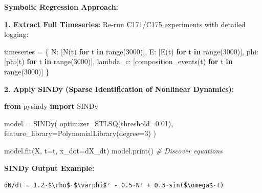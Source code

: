 \documentclass[
]{article}
\newenvironment{Shaded}{}{}
\newcommand{\BuiltInTok}[1]{\textcolor[rgb]{0.00,0.50,0.00}{#1}}
\newcommand{\CommentTok}[1]{\textcolor[rgb]{0.38,0.63,0.69}{\textit{#1}}}
\newcommand{\ControlFlowTok}[1]{\textcolor[rgb]{0.00,0.44,0.13}{\textbf{#1}}}
\newcommand{\DecValTok}[1]{\textcolor[rgb]{0.25,0.63,0.44}{#1}}
\newcommand{\FloatTok}[1]{\textcolor[rgb]{0.25,0.63,0.44}{#1}}
\newcommand{\ImportTok}[1]{\textcolor[rgb]{0.00,0.50,0.00}{\textbf{#1}}}
\newcommand{\KeywordTok}[1]{\textcolor[rgb]{0.00,0.44,0.13}{\textbf{#1}}}
\newcommand{\NormalTok}[1]{#1}
\newcommand{\OperatorTok}[1]{\textcolor[rgb]{0.40,0.40,0.40}{#1}}
\newcommand{\StringTok}[1]{\textcolor[rgb]{0.25,0.44,0.63}{#1}}
\begin{document}
\textbf{Symbolic Regression Approach:}

\textbf{1. Extract Full Timeseries:} Re-run C171/C175 experiments with
detailed logging:

\begin{Shaded}
\begin{Highlighting}[]
\NormalTok{timeseries }\OperatorTok{=}\NormalTok{ \{}
    \StringTok{\textquotesingle{}N\textquotesingle{}}\NormalTok{: [N(t) }\ControlFlowTok{for}\NormalTok{ t }\KeywordTok{in} \BuiltInTok{range}\NormalTok{(}\DecValTok{3000}\NormalTok{)],}
    \StringTok{\textquotesingle{}E\textquotesingle{}}\NormalTok{: [E(t) }\ControlFlowTok{for}\NormalTok{ t }\KeywordTok{in} \BuiltInTok{range}\NormalTok{(}\DecValTok{3000}\NormalTok{)],}
    \StringTok{\textquotesingle{}phi\textquotesingle{}}\NormalTok{: [phi(t) }\ControlFlowTok{for}\NormalTok{ t }\KeywordTok{in} \BuiltInTok{range}\NormalTok{(}\DecValTok{3000}\NormalTok{)],}
    \StringTok{\textquotesingle{}lambda\_c\textquotesingle{}}\NormalTok{: [composition\_events(t) }\ControlFlowTok{for}\NormalTok{ t }\KeywordTok{in} \BuiltInTok{range}\NormalTok{(}\DecValTok{3000}\NormalTok{)]}
\NormalTok{\}}
\end{Highlighting}
\end{Shaded}

\textbf{2. Apply SINDy (Sparse Identification of Nonlinear Dynamics):}

\begin{Shaded}
\begin{Highlighting}[]
\ImportTok{from}\NormalTok{ pysindy }\ImportTok{import}\NormalTok{ SINDy}

\NormalTok{model }\OperatorTok{=}\NormalTok{ SINDy(}
\NormalTok{    optimizer}\OperatorTok{=}\NormalTok{STLSQ(threshold}\OperatorTok{=}\FloatTok{0.01}\NormalTok{),}
\NormalTok{    feature\_library}\OperatorTok{=}\NormalTok{PolynomialLibrary(degree}\OperatorTok{=}\DecValTok{3}\NormalTok{)}
\NormalTok{)}

\NormalTok{model.fit(X, t}\OperatorTok{=}\NormalTok{t, x\_dot}\OperatorTok{=}\NormalTok{dX\_dt)}
\NormalTok{model.}\BuiltInTok{print}\NormalTok{()  }\CommentTok{\# Discover equations}
\end{Highlighting}
\end{Shaded}

\textbf{SINDy Output Example:}

\begin{verbatim}
dN/dt = 1.2·$\rho$·$\varphi$² - 0.5·N² + 0.3·sin($\omega$·t)
\end{verbatim}
\end{document}
